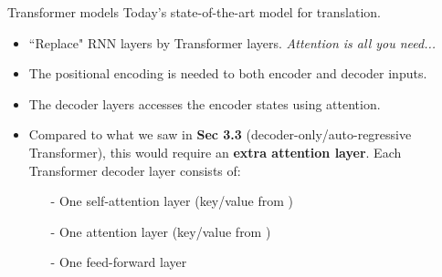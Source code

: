 
\begin{frame}{Transformer models}
\small{Today's state-of-the-art model for translation.}
 \begin{minipage}{0.6\textwidth}
\vsp
\begin{itemize}
\item ``Replace" RNN layers by Transformer layers. \textit{Attention is all you need...}
\pause
\item The positional encoding is needed to both encoder and decoder inputs.
\item The decoder layers accesses the encoder states using attention.
\pause
\item Compared to what we saw in \textbf{Sec 3.3} (decoder-only/auto-regressive Transformer), this would require an \textbf{extra attention layer}. Each Transformer decoder layer consists of:
\begin{itemize}
\item[-] One self-attention layer (key/value from )
\item[-] One attention layer (key/value from )
\item[-] One feed-forward layer
\end{itemize}
\end{itemize}
 \end{minipage}
 \begin{minipage}{0.38\textwidth}
\begin{figure}
\vspace{-5mm}
   \begin{center}

\end{center}
\end{figure}
\end{minipage}
\end{frame}

